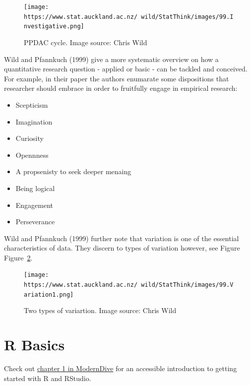 \documentclass[
  letterpaper,
  DIV=11,
  numbers=noendperiod]{scrreprt}
\providecommand{\tightlist}{%
  \setlength{\itemsep}{0pt}\setlength{\parskip}{0pt}}\usepackage{longtable,booktabs,array}
\theoremstyle{definition}
\theoremstyle{definition}
\theoremstyle{remark}
\begin{document}
\begin{figure}

{\centering \texttt{[image: https://www.stat.auckland.ac.nz/~wild/StatThink/images/99.Investigative.png]}

}

\caption{\label{fig-ppdac}PPDAC cycle. Image source: Chris Wild}

\end{figure}

Wild and Pfannkuch (1999) give a more systematic overview on how a
quantitative research question - applied or basic - can be tackled and
conceived. For example, in their paper the authors enumarate some
dispositions that researcher should embrace in order to fruitfully
engage in empirical research:

\begin{itemize}
\tightlist
\item
  Scepticism
\item
  Imagination
\item
  Curiosity
\item
  Opennness
\item
  A propsenisty to seek deeper menaing
\item
  Being logical
\item
  Engagement
\item
  Perseverance
\end{itemize}

Wild and Pfannkuch (1999) further note that variation is one of the
essential characteristics of data. They discern to types of variation
however, see Figure Figure~\ref{fig-variation}.

\begin{figure}

{\centering \texttt{[image: https://www.stat.auckland.ac.nz/~wild/StatThink/images/99.Variation1.png]}

}

\caption{\label{fig-variation}Two types of variartion. Image source:
Chris Wild}

\end{figure}

\hypertarget{r-basics}{%
\section{R Basics}\label{r-basics}}

Check out \href{https://moderndive.com/1-getting-started.html}{chapter 1
in ModernDive} for an accessible introduction to getting started with R
and RStudio.
\end{document}
